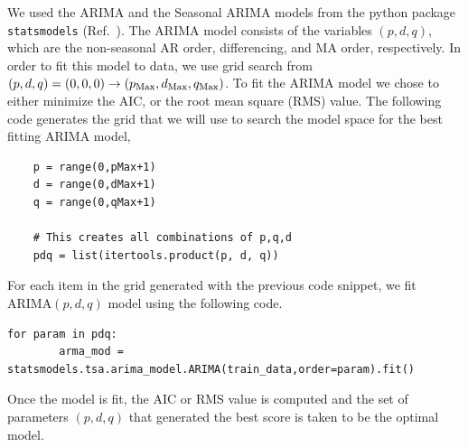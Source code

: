 \documentclass[10pt,a4paper]{article}
\begin{document}
We used the ARIMA and the Seasonal ARIMA models from the python package \verb|statsmodels| (Ref.~\cite{Skipper_2010}). The ARIMA model consists of the variables $(p,d,q)$, which are the non-seasonal AR order, differencing, and MA order, respectively. In order to fit this model to data, we use grid search from $(p,d,q)=(0,0,0) \rightarrow (p_{\rm Max},d_{\rm Max},q_{\rm Max}) $. To fit the ARIMA model we chose to either minimize the AIC, or the root mean square (RMS) value. The following code generates the grid that we will use to search the model space for the best fitting ARIMA model,
\begin{lstlisting}
	p = range(0,pMax+1)
	d = range(0,dMax+1)
	q = range(0,qMax+1)
	
	# This creates all combinations of p,q,d
	pdq = list(itertools.product(p, d, q))
\end{lstlisting}
For each item in the grid generated with the previous code snippet, we fit ARIMA$(p,d,q)$ model using the following code.
\begin{lstlisting}
for param in pdq:
		arma_mod = statsmodels.tsa.arima_model.ARIMA(train_data,order=param).fit()
\end{lstlisting}
Once the model is fit, the AIC or RMS value is computed and the set of parameters $(p,d,q)$ that generated the best score is taken to be the optimal model.\\
\end{document}
